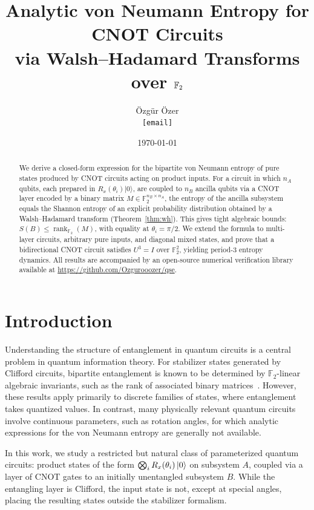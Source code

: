 \documentclass[11pt,a4paper]{article}
\title{Analytic von Neumann Entropy for CNOT Circuits\\
via Walsh–Hadamard Transforms over $\F_2$}
\author{\"Ozg\"ur \"Ozer\\
\small \texttt{[email]}}
\date{\today}
\newcommand{\F}{\mathbb{F}}
\newcommand{\rk}{\operatorname{rank}_{\F_2}}
\newcommand{\VNE}{S}
\begin{document}
\maketitle

\begin{abstract}
We derive a closed-form expression for the bipartite von Neumann entropy of
pure states produced by CNOT circuits acting on product inputs.
For a circuit in which $n_A$ qubits, each prepared in $R_x(\theta_i)|0\rangle$,
are coupled to $n_B$ ancilla qubits via a CNOT layer encoded by a binary
matrix $M \in \F_2^{n_B \times n_A}$, the entropy of the ancilla subsystem
equals the Shannon entropy of an explicit probability distribution
obtained by a Walsh–Hadamard transform (Theorem~\ref{thm:wh}).
This gives tight algebraic bounds: $\VNE(B) \leq \rk(M)$, with equality at
$\theta_i = \pi/2$. We extend the formula to multi-layer circuits, arbitrary
pure inputs, and diagonal mixed states, and prove that a bidirectional CNOT
circuit satisfies $U^3 = I$ over $\F_2^2$, yielding period-3 entropy dynamics.
All results are accompanied by an open-source numerical verification library
available at \url{https://github.com/Ozgurooozer/qse}.
\end{abstract}

\tableofcontents
\bigskip

\section{Introduction}
\label{sec:intro}

Understanding the structure of entanglement in quantum circuits is a central
problem in quantum information theory.  For stabilizer states generated by
Clifford circuits, bipartite entanglement is known to be determined by
$\F_2$-linear algebraic invariants, such as the rank of associated binary
matrices~\cite{audenaert2005entanglement,fattal2004entanglement}.  However,
these results apply primarily to discrete families of states, where
entanglement takes quantized values.  In contrast, many physically relevant
quantum circuits involve continuous parameters, such as rotation angles, for
which analytic expressions for the von Neumann entropy are generally not
available.

In this work, we study a restricted but natural class of parameterized quantum
circuits: product states of the form $\bigotimes_i R_x(\theta_i)\ket{0}$ on
subsystem $A$, coupled via a layer of CNOT gates to an initially unentangled
subsystem $B$.  While the entangling layer is Clifford, the input state is
not, except at special angles, placing the resulting states outside the
stabilizer formalism.
\end{document}
